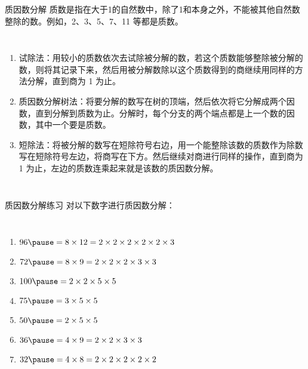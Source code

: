 \documentclass[aspectratio=169]{ctexbeamer} %
\begin{document}
\begin{frame}[t]{质因数分解}
\alert{质数}是指在\alert{大于1的自然数}中，除了\alert{1和本身}之外，\alert{不能}被其他自然数整除的数。例如，2、3、5、7、11 等都是质数。
\begin{columns}
\begin{enumerate}[label={\arabic*.}]
\item \alert{试除法：}用较小的质数依次去试除被分解的数，若这个质数能够整除被分解的数，则将其记录下来，然后用被分解数除以这个质数得到的商继续用同样的方法分解，直到商为 1 为止。
\item \alert{质因数分解树法：}将要分解的数写在树的顶端，然后依次将它分解成两个因数，直到分解到质数为止。分解时，每个分支的两个端点都是上一个数的因数，其中一个要是质数。
\item \alert{短除法：}将被分解的数写在短除符号右边，用一个能整除该数的质数作为除数写在短除符号左边，将商写在下方。然后继续对商进行同样的操作，直到商为 1 为止，左边的质数连乘起来就是该数的质因数分解。

\end{enumerate}
\end{columns}
\end{frame}

\begin{frame}[t]{质因数分解练习}
对以下数字进行质因数分解：
\begin{columns}
\begin{enumerate}[label={\arabic*.}]
\item $96 \pause = 8 \times 12 = 2 \times 2 \times 2 \times 2 \times 2 \times 3$
\item $72 \pause = 8 \times 9 = 2 \times 2 \times 2 \times 3 \times 3$
\item $100 \pause = 2 \times 2 \times 5 \times 5$
\item $75 \pause = 3 \times 5 \times 5$
\item $50 \pause = 2 \times 5 \times 5$
\item $36 \pause = 4 \times 9 = 2 \times 2 \times 3 \times 3$
\item $32 \pause = 4 \times 8 = 2 \times 2 \times 2 \times 2 \times 2$
\end{enumerate}
\end{columns}
\end{frame}
\end{document}
